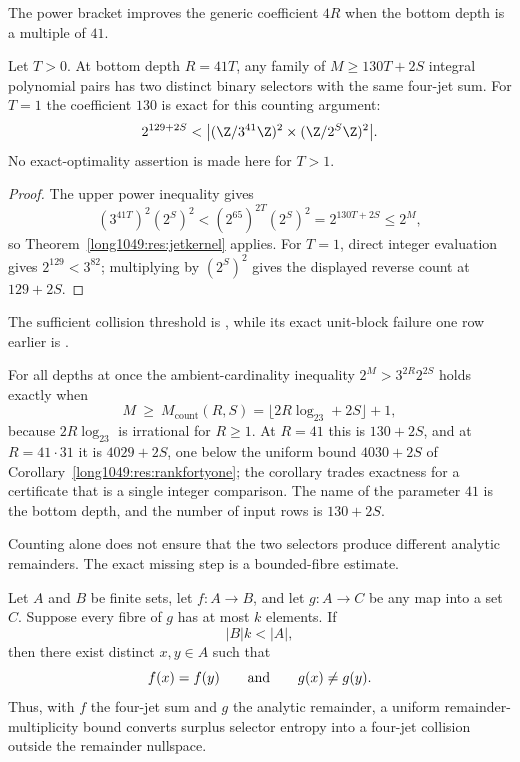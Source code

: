 The power bracket improves the generic coefficient $4R$ when the bottom depth
is a multiple of $41$.

\begin{corollary}\label{long1049:res:rankfortyone}
Let $T>0$.  At bottom depth $R=41T$, any family of
$M\ge130T+2S$ integral polynomial pairs has two distinct binary selectors
with the same four-jet sum.  For $T=1$ the coefficient $130$ is exact for
this counting argument:
\[
 2^{129+2S}<\bigl| (\Z/3^{41}\Z)^2\times
                       (\Z/2^S\Z)^2\bigr|.
\]
No exact-optimality assertion is made here for $T>1$.
\end{corollary}

\begin{proof}
The upper power inequality gives
\[
 (3^{41T})^2(2^S)^2
 <(2^{65})^{2T}(2^S)^2=2^{130T+2S}\le2^M,
\]
so Theorem~\ref{long1049:res:jetkernel} applies.  For $T=1$, direct integer
evaluation gives $2^{129}<3^{82}$; multiplying by $(2^S)^2$ gives the
displayed reverse count at $129+2S$.
\end{proof}

\noindent The sufficient collision threshold is
,
while its exact unit-block failure one row earlier is
.

For all depths at once the ambient-cardinality inequality $2^{M}>3^{2R}2^{2S}$
holds exactly when
\[
 M\ \ge\ M_{\mathrm{count}}(R,S)=\bigl\lfloor2R\log_23+2S\bigr\rfloor+1,
\]
because $2R\log_23$ is irrational for $R\ge1$.  At $R=41$ this is $130+2S$, and
at $R=41\cdot31$ it is $4029+2S$, one below the uniform bound $4030+2S$ of
Corollary~\ref{long1049:res:rankfortyone}; the corollary trades exactness for a
certificate that is a single integer comparison.  The name of the parameter $41$
is the bottom depth, and the number of input rows is $130+2S$.

Counting alone does not ensure that the two selectors produce different
analytic remainders.  The exact missing step is a bounded-fibre estimate.

\begin{theorem}\label{long1049:res:boundedfibre}
Let $A$ and $B$ be finite sets, let $f:A\to B$, and let $g:A\to C$ be any
map into a set $C$.  Suppose every fibre of $g$ has at most $k$ elements.  If
\[
 |B|k<|A|,
\]
then there exist distinct $x,y\in A$ such that
\[
 f(x)=f(y)\qquad\hbox{and}\qquad g(x)\ne g(y).
\]
Thus, with $f$ the four-jet sum and $g$ the analytic remainder, a uniform
remainder-multiplicity bound converts surplus selector entropy into a
four-jet collision outside the remainder nullspace.
\end{theorem}

